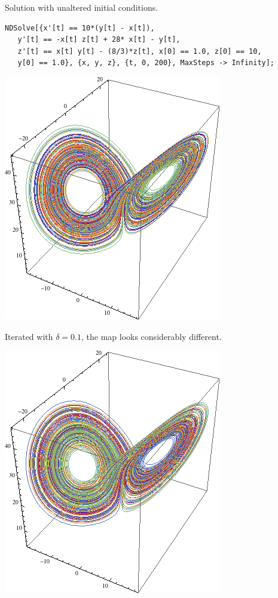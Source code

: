 \documentclass[letterpaper,10pt]{article}
\begin{document}
\begin{description}
Solution with unaltered initial conditions.
\begin{verbatim}
NDSolve[{x'[t] == 10*(y[t] - x[t]), 
   y'[t] == -x[t] z[t] + 28* x[t] - y[t], 
   z'[t] == x[t] y[t] - (8/3)*z[t], x[0] == 1.0, z[0] == 10, 
   y[0] == 1.0}, {x, y, z}, {t, 0, 200}, MaxSteps -> Infinity];
\end{verbatim}
\begin{center}
  \includegraphics[scale=0.5]{images/lorenz0.png}
\end{center}
Iterated with $\delta=0.1$, the map looks considerably different.
\begin{center}
  \includegraphics[scale=0.5]{images/lorenz1.png}

\end{center}
\end{description}
\end{document}
